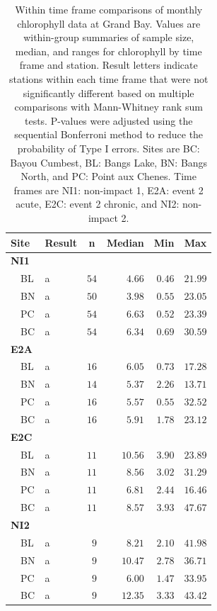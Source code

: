 \documentclass[letterpaper,12pt]{article}\usepackage[]{graphicx}\usepackage[]{color}
\begin{document}
\begin{table}[!tbp]
\caption{Within time frame comparisons of monthly chlorophyll data at Grand Bay.  Values are within-group summaries of sample size, median, and ranges for chlorophyll by time frame and station.  Result letters indicate stations within each time frame that were not significantly different based on multiple comparisons with Mann-Whitney rank sum tests.  P-values were adjusted using the sequential Bonferroni method to reduce the probability of Type I errors. Sites are BC: Bayou Cumbest, BL: Bangs Lake, BN: Bangs North, and PC: Point aux Chenes.  Time frames are NI1: non-impact 1, E2A: event 2 acute, E2C: event 2 chronic, and NI2: non-impact 2.\label{tab:chltab2}} 
\begin{center}
\begin{tabular}{llrrrr}
\hline\hline
\multicolumn{1}{l}{Site}&\multicolumn{1}{c}{Result}&\multicolumn{1}{c}{n}&\multicolumn{1}{c}{Median}&\multicolumn{1}{c}{Min}&\multicolumn{1}{c}{Max}\tabularnewline
\hline
{\bfseries NI1}&&&&&\tabularnewline
~~BL&a&$54$&$ 4.66$&$0.46$&$21.99$\tabularnewline
~~BN&a&$50$&$ 3.98$&$0.55$&$23.05$\tabularnewline
~~PC&a&$54$&$ 6.63$&$0.52$&$23.39$\tabularnewline
~~BC&a&$54$&$ 6.34$&$0.69$&$30.59$\tabularnewline
\hline
{\bfseries E2A}&&&&&\tabularnewline
~~BL&a&$16$&$ 6.05$&$0.73$&$17.28$\tabularnewline
~~BN&a&$14$&$ 5.37$&$2.26$&$13.71$\tabularnewline
~~PC&a&$16$&$ 5.57$&$0.55$&$32.52$\tabularnewline
~~BC&a&$16$&$ 5.91$&$1.78$&$23.12$\tabularnewline
\hline
{\bfseries E2C}&&&&&\tabularnewline
~~BL&a&$11$&$10.56$&$3.90$&$23.89$\tabularnewline
~~BN&a&$11$&$ 8.56$&$3.02$&$31.29$\tabularnewline
~~PC&a&$11$&$ 6.81$&$2.44$&$16.46$\tabularnewline
~~BC&a&$11$&$ 8.57$&$3.93$&$47.67$\tabularnewline
\hline
{\bfseries NI2}&&&&&\tabularnewline
~~BL&a&$ 9$&$ 8.21$&$2.10$&$41.98$\tabularnewline
~~BN&a&$ 9$&$10.47$&$2.78$&$36.71$\tabularnewline
~~PC&a&$ 9$&$ 6.00$&$1.47$&$33.95$\tabularnewline
~~BC&a&$ 9$&$12.35$&$3.33$&$43.42$\tabularnewline
\hline
\end{tabular}\end{center}
\end{table}

\clearpage
\end{document}
